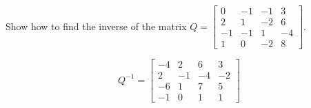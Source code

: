
\begin{exerciseStatement}


Show how to find the inverse of the matrix \(Q= \left[\begin{array}{cccc}
0 & -1 & -1 & 3 \\
2 & 1 & -2 & 6 \\
-1 & -1 & 1 & -4 \\
1 & 0 & -2 & 8
\end{array}\right] \).


\end{exerciseStatement}
    
\begin{exerciseAnswer} 
\[Q^{-1}= \left[\begin{array}{cccc}
-4 & 2 & 6 & 3 \\
2 & -1 & -4 & -2 \\
-6 & 1 & 7 & 5 \\
-1 & 0 & 1 & 1
\end{array}\right] \]
\end{exerciseAnswer}
    
